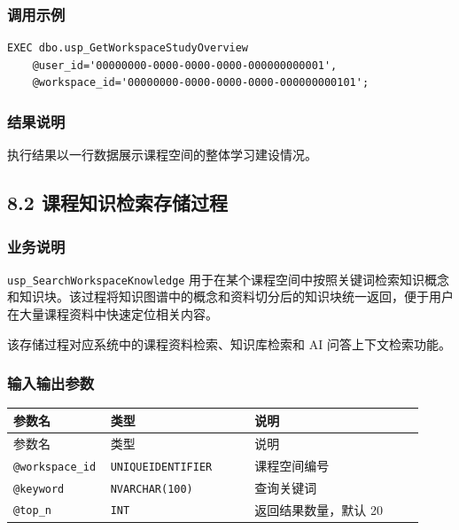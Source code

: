 \documentclass[10pt,a4paper,fontset=none]{ctexart}
\begin{document}
\subsubsection*{调用示例}

\begin{Verbatim}[fontsize=\scriptsize,frame=single]
EXEC dbo.usp_GetWorkspaceStudyOverview
    @user_id='00000000-0000-0000-0000-000000000001',
    @workspace_id='00000000-0000-0000-0000-000000000101';
\end{Verbatim}

\subsubsection*{结果说明}

执行结果以一行数据展示课程空间的整体学习建设情况。\par

\subsection*{8.2 课程知识检索存储过程}

\subsubsection*{业务说明}

\texttt{usp\_SearchWorkspaceKnowledge} 用于在某个课程空间中按照关键词检索知识概念和知识块。该过程将知识图谱中的概念和资料切分后的知识块统一返回，便于用户在大量课程资料中快速定位相关内容。\par

该存储过程对应系统中的课程资料检索、知识库检索和 AI 问答上下文检索功能。\par

\subsubsection*{输入输出参数}

\begingroup\scriptsize
\renewcommand{\arraystretch}{1.18}
\setlength{\LTleft}{0pt}
\setlength{\LTright}{0pt}
\begin{longtable}{>{\raggedright\arraybackslash}p{0.18\linewidth}>{\raggedright\arraybackslash}p{0.34\linewidth}>{\raggedright\arraybackslash}p{0.40\linewidth}}
\toprule
参数名 & 类型 & 说明 \\
\midrule
\endfirsthead
\toprule
参数名 & 类型 & 说明 \\
\midrule
\endhead
\texttt{@workspace\_id} & \texttt{UNIQUEIDENTIFIER} & 课程空间编号 \\
\texttt{@keyword} & \texttt{NVARCHAR(100)} & 查询关键词 \\
\texttt{@top\_n} & \texttt{INT} & 返回结果数量，默认 20 \\
\bottomrule
\end{longtable}
\endgroup
\end{document}
